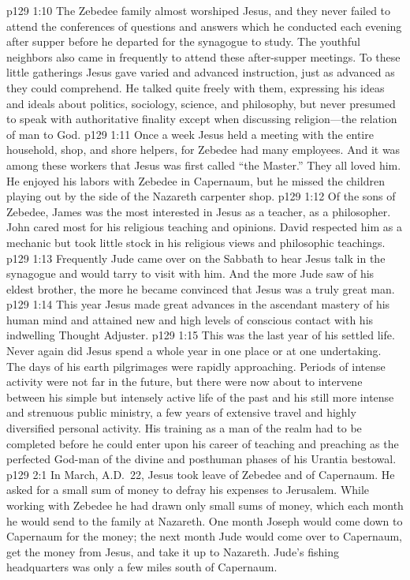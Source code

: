 \vs p129 1:10 The Zebedee family almost worshiped Jesus, and they never failed to attend the conferences of questions and answers which he conducted each evening after supper before he departed for the synagogue to study. The youthful neighbors also came in frequently to attend these after\hyp{}supper meetings. To these little gatherings Jesus gave varied and advanced instruction, just as advanced as they could comprehend. He talked quite freely with them, expressing his ideas and ideals about politics, sociology, science, and philosophy, but never presumed to speak with authoritative finality except when discussing religion---the relation of man to God.
\vs p129 1:11 Once a week Jesus held a meeting with the entire household, shop, and shore helpers, for Zebedee had many employees. And it was among these workers that Jesus was first called “the Master.” They all loved him. He enjoyed his labors with Zebedee in Capernaum, but he missed the children playing out by the side of the Nazareth carpenter shop.
\vs p129 1:12 Of the sons of Zebedee, James was the most interested in Jesus as a teacher, as a philosopher. John cared most for his religious teaching and opinions. David respected him as a mechanic but took little stock in his religious views and philosophic teachings.
\vs p129 1:13 Frequently Jude came over on the Sabbath to hear Jesus talk in the synagogue and would tarry to visit with him. And the more Jude saw of his eldest brother, the more he became convinced that Jesus was a truly great man.
\pc \vs p129 1:14 This year Jesus made great advances in the ascendant mastery of his human mind and attained new and high levels of conscious contact with his indwelling Thought Adjuster.
\vs p129 1:15 This was the last year of his settled life. Never again did Jesus spend a whole year in one place or at one undertaking. The days of his earth pilgrimages were rapidly approaching. Periods of intense activity were not far in the future, but there were now about to intervene between his simple but intensely active life of the past and his still more intense and strenuous public ministry, a few years of extensive travel and highly diversified personal activity. His training as a man of the realm had to be completed before he could enter upon his career of teaching and preaching as the perfected God\hyp{}man of the divine and posthuman phases of his Urantia bestowal.\plusone
{}
\vs p129 2:1 In March, A.D.~22, Jesus took leave of Zebedee and of Capernaum. He asked for a small sum of money to defray his expenses to Jerusalem. While working with Zebedee he had drawn only small sums of money, which each month he would send to the family at Nazareth. One month Joseph would come down to Capernaum for the money; the next month Jude would come over to Capernaum, get the money from Jesus, and take it up to Nazareth. Jude’s fishing headquarters was only a few miles south of Capernaum.
